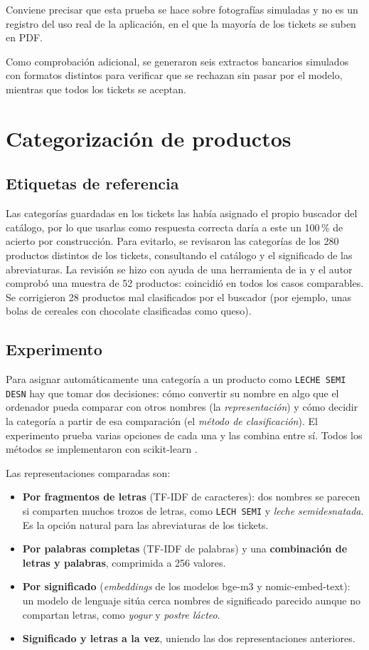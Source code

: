 Conviene precisar que esta prueba se hace sobre fotografías simuladas y no es un registro del uso real de la aplicación, en el que la mayoría de los tickets se suben en PDF.

Como comprobación adicional, se generaron seis extractos bancarios simulados con formatos distintos para verificar que se rechazan sin pasar por el modelo, mientras que todos los tickets se aceptan.

\section{Categorización de productos}
\label{s:val-clustering}

\subsection{Etiquetas de referencia}
Las categorías guardadas en los tickets las había asignado el propio buscador del catálogo, por lo que usarlas como respuesta correcta daría a este un 100\,\% de acierto por construcción. Para evitarlo, se revisaron las categorías de los 280 productos distintos de los tickets, consultando el catálogo y el significado de las abreviaturas. La revisión se hizo con ayuda de una herramienta de \gls{ia} y el autor comprobó una muestra de 52 productos: coincidió en todos los casos comparables. Se corrigieron 28 productos mal clasificados por el buscador (por ejemplo, unas bolas de cereales con chocolate clasificadas como queso).

\subsection{Experimento}
Para asignar automáticamente una categoría a un producto como \texttt{LECHE SEMI DESN} hay que tomar dos decisiones: cómo convertir su nombre en algo que el ordenador pueda comparar con otros nombres (la \emph{representación}) y cómo decidir la categoría a partir de esa comparación (el \emph{método de clasificación}). El experimento prueba varias opciones de cada una y las combina entre sí. Todos los métodos se implementaron con scikit-learn \parencite{pedregosa2011scikit}.

Las representaciones comparadas son:

\begin{itemize}
    \item \textbf{Por fragmentos de letras} (TF-IDF de caracteres): dos nombres se parecen si comparten muchos trozos de letras, como \texttt{LECH SEMI} y \textit{leche semidesnatada}. Es la opción natural para las abreviaturas de los tickets.
    \item \textbf{Por palabras completas} (TF-IDF de palabras) y una \textbf{combinación de letras y palabras}, comprimida a 256 valores.
    \item \textbf{Por significado} (\textit{embeddings} de los modelos bge-m3 y nomic-embed-text): un modelo de lenguaje sitúa cerca nombres de significado parecido aunque no compartan letras, como \textit{yogur} y \textit{postre lácteo}.
    \item \textbf{Significado y letras a la vez}, uniendo las dos representaciones anteriores.
\end{itemize}

